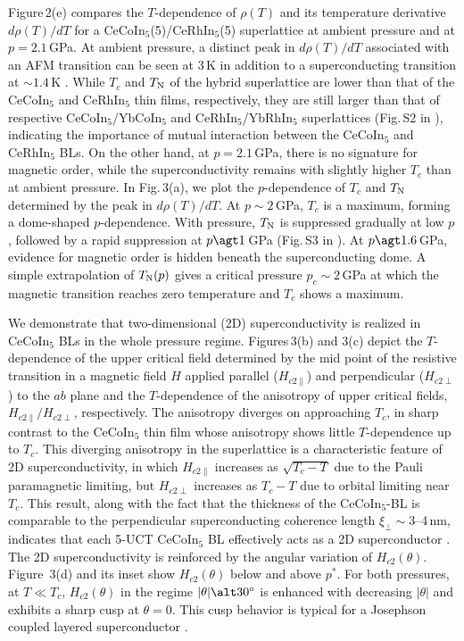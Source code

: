 \documentclass[twocolumn,preprintnumbers,amsmath,amssymb,prl]{revtex4}
\begin{document}
 
Figure\,2(e)  compares  the $T$-dependence of $\rho(T)$ and its temperature derivative $d\rho(T)/dT$ for a CeCoIn$_5$(5)/CeRhIn$_5$(5) superlattice at ambient pressure and at $p=2.1$\,GPa.   At ambient pressure, a distinct peak in $d\rho(T)/dT$ associated with an AFM transition can be seen at 3\,K in addition to a superconducting transition at $\sim1.4$\,K \cite{Knebel2008}. While $T_c$ and $T_{\rm N}$ of the hybrid superlattice are lower than that of the CeCoIn$_5$ and CeRhIn$_5$ thin films, respectively, they are still larger than that of respective CeCoIn$_5$/YbCoIn$_5$ and CeRhIn$_5$/YbRhIn$_5$ superlattices (Fig.\,S2 in \cite{SM}), indicating the importance of mutual interaction between the CeCoIn$_5$ and CeRhIn$_5$ BLs.  On the other hand, at $p=2.1$\,GPa, there is no signature for magnetic order, while the superconductivity remains with slightly higher $T_c$ than at ambient pressure.  In Fig.\,3(a),  we plot the $p$-dependence of $T_c$ and $T_{\rm N}$ determined by the peak in $d\rho(T)/dT$.   At $p\sim2$\,GPa,  $T_c$ is a maximum, forming a dome-shaped $p$-dependence.  With pressure, $T_{\rm N}$ is suppressed gradually at low $p$, followed by a rapid suppression at $p\agt1$\,GPa (Fig.\,S3 in \cite{SM}).   At $p\agt 1.6$\,GPa, evidence for magnetic order is hidden beneath the superconducting dome. A simple extrapolation of $T_{\rm N}(p)$ gives a critical pressure $p_c\sim2$\,GPa at which the magnetic transition reaches zero temperature and $T_c$ shows a maximum. 

We demonstrate that two-dimensional (2D) superconductivity is realized  in CeCoIn$_5$ BLs in the whole pressure regime.   Figures\,3(b) and 3(c) depict the $T$-dependence of the upper critical field determined by the mid point of the resistive transition in a magnetic field $H$ applied  parallel  ($H_{c2\parallel}$)  and perpendicular  ($H_{c2\perp}$)  to the $ab$ plane and the $T$-dependence of the anisotropy of upper critical fields, $H_{c2\parallel}/H_{c2\perp}$, respectively.  The anisotropy diverges on approaching $T_c$, in sharp contrast to the CeCoIn$_5$ thin film whose anisotropy shows little $T$-dependence up to $T_c$.  This diverging anisotropy in the superlattice is a characteristic feature of 2D superconductivity, in which  $H_{c2\parallel}$ increases as $\sqrt{T_c-T}$ due to the Pauli paramagnetic limiting, but   $H_{c2\perp}$ increases as $T_c-T$ due to orbital limiting near $T_c$.    This result, along with the fact that the thickness of the CeCoIn$_5$-BL is comparable to the perpendicular superconducting coherence length $\xi_{\perp}\sim3$--4\,nm, indicates that each 5-UCT CeCoIn$_5$ BL effectively acts as a 2D superconductor \cite{Mizukami}.   The 2D superconductivity is reinforced by the angular variation of $H_{c2}(\theta)$.  Figure \,3(d) and its inset show $H_{c2}(\theta)$ below and above $p^*$.   For both pressures, at $T\ll T_c$, %
$H_{c2}(\theta)$ in the regime $|\theta|\alt30^{\circ}$ is enhanced with decreasing $|\theta|$ and exhibits a sharp cusp at $\theta=0$.  This cusp behavior is typical for a Josephson coupled layered superconductor \cite{Tinkham}.
\end{document}
